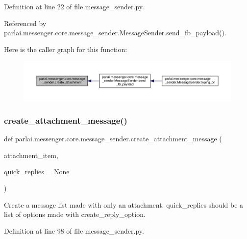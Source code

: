 Definition at line 22 of file message\+\_\+sender.\+py.



Referenced by parlai.\+messenger.\+core.\+message\+\_\+sender.\+Message\+Sender.\+send\+\_\+fb\+\_\+payload().

Here is the caller graph for this function\+:
\nopagebreak
\begin{figure}[H]
\begin{center}
\leavevmode
\includegraphics[width=350pt]{namespaceparlai_1_1messenger_1_1core_1_1message__sender_ae26a16d26bdd28795220ad9ef76c96fd_icgraph}
\end{center}
\end{figure}
\mbox{\label{namespaceparlai_1_1messenger_1_1core_1_1message__sender_a5bd9c5675042d0a3a4fc808bab365548}} 
\subsubsection{\texorpdfstring{create\+\_\+attachment\+\_\+message()}{create\_attachment\_message()}}
{\footnotesize\ttfamily def parlai.\+messenger.\+core.\+message\+\_\+sender.\+create\+\_\+attachment\+\_\+message (\begin{DoxyParamCaption}\item[{}]{attachment\+\_\+item,  }\item[{}]{quick\+\_\+replies = {\ttfamily None} }\end{DoxyParamCaption})}

\begin{DoxyVerb}Create a message list made with only an attachment.
quick_replies should be a list of options made with create_reply_option.
\end{DoxyVerb}
 

Definition at line 98 of file message\+\_\+sender.\+py.




